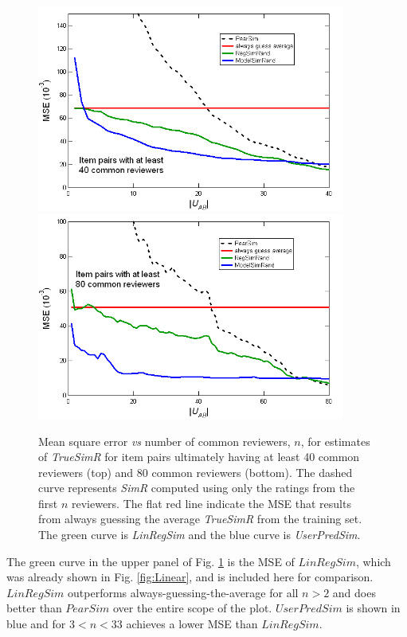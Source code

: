 \documentclass[11pt]{article}
\begin{document}
{\begin{figure}[!htbp]
    \centering
    \includegraphics[width=0.9\textwidth]{MSE_SimR_40.png}
    \includegraphics[width=0.9\textwidth]{MSE_SimR_80.png}
	\caption{Mean square error {\em vs} number of common reviewers, $n$, for
estimates of {\em TrueSimR} for item pairs ultimately having at least 40 common
reviewers (top) and 80 common reviewers (bottom). The dashed curve represents
{\em SimR} computed using only the ratings from the first $n$ reviewers. The
flat red line indicate the MSE that results from always guessing the average
{\em TrueSimR} from the training set. The green curve is {\em LinRegSim} and the
blue curve is {\em UserPredSim}. }
    \label{fig:MSE_SimR}
\end{figure}

The green curve in the upper panel of Fig. \ref{fig:MSE_SimR} is the MSE of
$LinRegSim$, which was already shown in Fig. \ref{fig:Linear}, and is included
here for comparison.  $LinRegSim$ outperforms always-guessing-the-average for
all $n > 2$ and does better than $PearSim$ over the entire scope of the plot.
$UserPredSim$ is shown in blue and for $3 < n < 33$ achieves a lower MSE than
$LinRegSim$.

}
\end{document}
